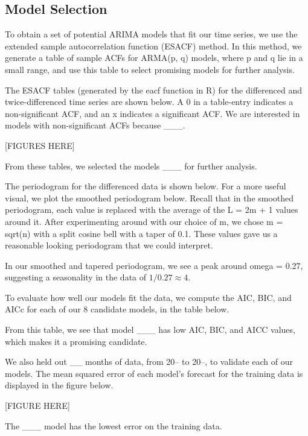 \documentclass[font=12pt]{paper}
\begin{document}
\subsection{Model Selection}

To obtain a set of potential ARIMA models that fit our time series, we use the extended sample autocorrelation function (ESACF) method. In this method, we generate a table of sample ACFs for ARMA(p, q) models, where p and q lie in a small range, and use this table to select promising models for further analysis.

The ESACF tables (generated by the eacf function in R) for the differenced and twice-differenced time series are shown below. A 0 in a table-entry indicates a non-significant ACF, and an x indicates a significant ACF. We are interested in models with non-significant ACFs because ___.

[FIGURES HERE]

From these tables, we selected the models ___ for further analysis. 


The periodogram for the differenced data is shown below. For a more useful visual, we plot the smoothed periodogram below. Recall that in the smoothed periodogram, each value is replaced with the average of the L = 2m + 1 values around it. After experimenting around with our choice of m, we chose m = sqrt(n) with a split cosine bell with a taper of 0.1. These values gave us a reasonable looking periodogram that we could interpret.



In our smoothed and tapered periodogram, we see a peak around omega = 0.27, suggesting a seasonality in the data of $1/0.27 \approx 4$.


To evaluate how well our models fit the data, we compute the AIC, BIC, and AICc for each of our 8 candidate models, in the table below.

From this table, we see that model ___ has low AIC, BIC, and AICC values, which makes it a promising candidate.

We also held out __ months of data, from 20-- to 20--, to validate each of our models. The mean squared error of each model’s forecast for the training data is displayed in the figure below.

[FIGURE HERE]

The ___ model has the lowest error on the training data. 
\end{document}

